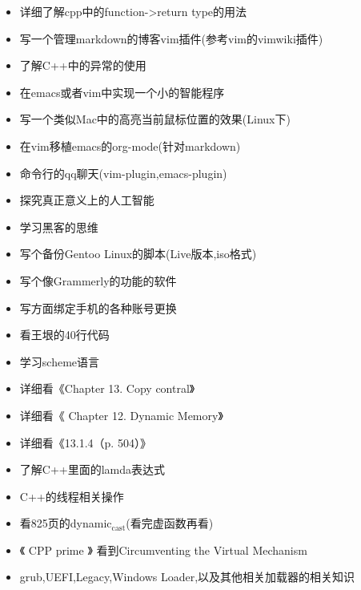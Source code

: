 \documentclass[presentation]{beamer}
\begin{document}
\begin{frame}[label={sec:org2e63169}]{}
\begin{itemize}
\item 详细了解cpp中的function->return type的用法
\item 写一个管理markdown的博客vim插件(参考vim的vimwiki插件)
\item 了解C++中的异常的使用
\item 在emacs或者vim中实现一个小的智能程序
\item 写一个类似Mac中的高亮当前鼠标位置的效果(Linux下)
\item 在vim移植emacs的org-mode(针对markdown)
\item 命令行的qq聊天(vim-plugin,emacs-plugin)
\item 探究真正意义上的人工智能
\item 学习黑客的思维
\item 写个备份Gentoo Linux的脚本(Live版本,iso格式)
\item 写个像Grammerly的功能的软件
\item 写方面绑定手机的各种账号更换
\item 看王垠的40行代码
\item 学习scheme语言
\item 详细看《Chapter 13. Copy contral》
\item 详细看《 Chapter 12. Dynamic Memory》
\item 详细看《13.1.4（p. 504）》
\item 了解C++里面的lamda表达式
\item C++的线程相关操作
\item 看825页的dynamic\(_{\text{cast}}\)(看完虚函数再看)
\item 《 CPP prime 》 看到Circumventing the Virtual Mechanism
\item grub,UEFI,Legacy,Windows Loader,以及其他相关加载器的相关知识
\end{itemize}
\end{frame}

\begin{frame}[label={sec:org93c62bc}]{}
\end{frame}
\end{document}
